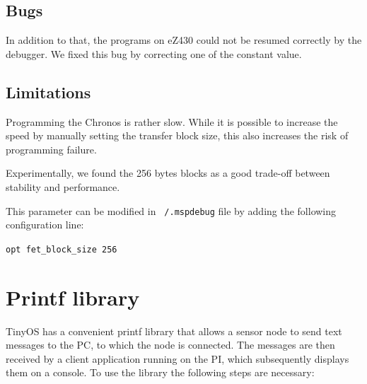 \subsection{Bugs}
In addition to that, the programs on eZ430 could not be resumed correctly by the debugger.
We fixed this bug by correcting one of the constant value.

\subsection{Limitations}

Programming the Chronos is rather slow. While it is possible to increase the speed by manually setting the transfer block size, this also increases the risk of programming failure.

Experimentally, we found the 256 bytes blocks as a good trade-off between stability and performance.

This parameter can be modified in \texttt{~/.mspdebug} file by adding the following configuration line:

\texttt{opt fet\_block\_size 256}


\section{Printf library}
\label{sec:printf_library}

TinyOS has a convenient printf library that allows a sensor node to send text messages to the PC, to which the node is connected. The messages are then received by a client application running on the PI, which subsequently displays them on a console. To use the library the following steps are necessary:

